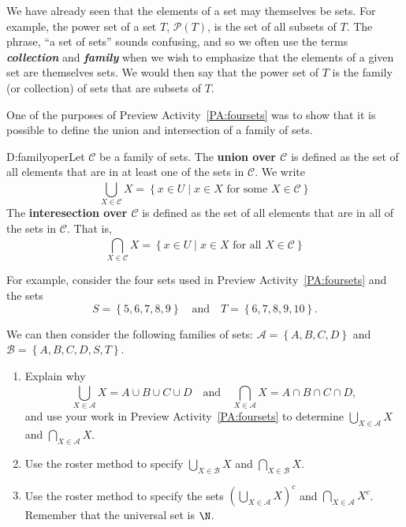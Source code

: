 \begin{previewactivity} \label{PA:families} \hfill

We have already seen that the elements of a set may themselves be sets.  For example, the power set of a set $T$, $\mathcal{P}( T )$, is the set of all subsets of $T$.    The phrase, ``a set of sets'' sounds confusing, and so we often use the terms \textbf{\emph{collection}} and 
\textbf{\emph{family}}
%
 when we wish to emphasize that the elements of a given set are themselves sets.  We would then say that the power set of $T$ is the family (or collection) of sets that are subsets of $T$.

One of the purposes of Preview Activity~\ref{PA:foursets} was to show that it is possible to define the union and intersection of a family of sets.

\begin{defbox}{D:familyoper}{Let $\mathcal{C}$ be a family of sets.  The \textbf{union over 
$\mathbf{\mathcal{C}}$}
%
%
 is defined as the set of all elements that are in at least one of the sets in $\mathcal{C}$.  We write
\[
\bigcup_{X \in \mathscr{C}}^{}X = \left\{x \in U \mid x \in X \text{ for some } X \in \mathscr{C} \right\} \label{sym:bigcup}
\]
The \textbf{interesection over $\mathbf{\mathcal{C}}$}
%
%
 is defined as the set of all elements that are in all of the sets in $\mathcal{C}$.  That is, 
\[
\bigcap_{X \in \mathscr{C}}^{}X = \left\{x \in U \mid x \in X \text{ for all } X \in \mathscr{C} \right\} \label{sym:bigcap}
\]
}
\end{defbox}

For example, consider the four sets used in Preview Activity~\ref{PA:foursets} and the sets
\[
S = \left\{5, 6, 7, 8, 9 \right\} \quad \text{and} \quad T = \left\{6, 7, 8, 9, 10 \right\}.
\]

We can then consider the following families of sets:  
$\mathscr{A} = \left\{A, B, C , D \right\}$  and  
$\mathscr{B} = \left\{A, B, C , D, S, T \right\}$.


\begin{enumerate}
\item Explain why 
\[
\bigcup_{X \in \mathscr{A}}^{}X = A \cup B \cup C \cup D \quad \text{and} \quad
\bigcap_{X \in \mathscr{A}}^{}X = A \cap B \cap C \cap D,
\]
and use your work in Preview Activity~\ref{PA:foursets} to determine 
$\bigcup\limits_{X \in \mathscr{A}}^{}X$ and $\bigcap\limits_{X \in \mathscr{A}}^{}X$\!.

\item Use the roster method to specify
$\bigcup\limits_{X \in \mathscr{B}}^{}X$ and   $\bigcap\limits_{X \in \mathscr{B}}^{}X$\!.

\item Use the roster method to specify the sets 
$\left( \bigcup\limits_{X \in \mathscr{A}}^{}X \right)^c$ and $\bigcap\limits_{X \in \mathscr{A}}^{}X^c$\!.  Remember that the universal set is $\N$.
\end{enumerate}
\end{previewactivity}
\hbreak


